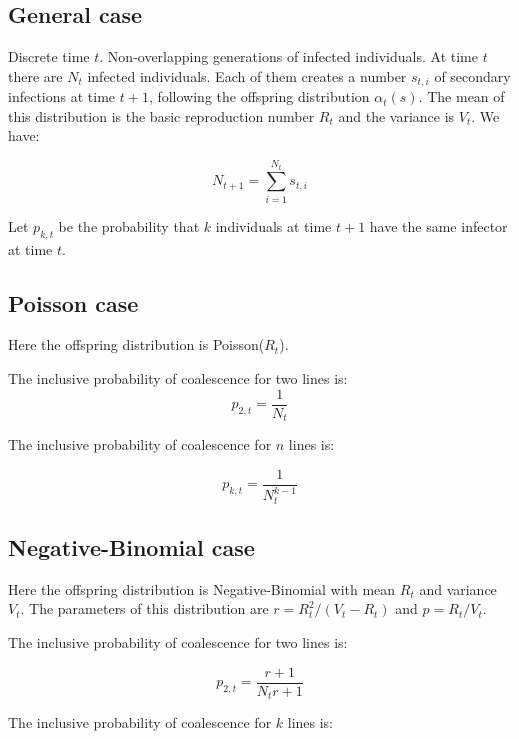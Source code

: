 \documentclass{article}
\begin{document}
\subsection{General case}

Discrete time $t$. Non-overlapping generations of infected individuals. At time $t$ there are $N_t$ infected individuals. Each of them creates a number $s_{t,i}$ of secondary infections at time $t+1$, following the offspring distribution $\alpha_t(s)$. The mean of this distribution is the basic reproduction number $R_t$ and the variance is $V_t$. We have:

\begin{equation}
N_{t+1}=\sum_{i=1}^{N_t} s_{t,i}
\label{eq:summation}
\end{equation}

Let $p_{k,t}$ be the probability that $k$ individuals at time $t+1$ have the same infector at time $t$.

\subsection{Poisson case}

Here the offspring distribution is Poisson($R_t$).

The inclusive probability of coalescence for two lines is:
\begin{equation}
p_{2,t}=\frac{1}{N_t}
\end{equation}

The inclusive probability of coalescence for $n$ lines is:

\begin{equation}
p_{k,t}=\frac{1}{N_t^{k-1}}
\end{equation}

\subsection{Negative-Binomial case}

Here the offspring distribution is Negative-Binomial with mean $R_t$ and variance $V_t$.
The parameters of this distribution are 
$r=R_t^2/(V_t-R_t)$ and $p=R_t/V_t$.

The inclusive probability of coalescence for two lines is:

\begin{equation}
p_{2,t}=\frac{r+1}{N_t r+1}
\end{equation}

The inclusive probability of coalescence for $k$ lines is:
\end{document}
